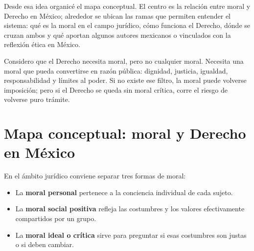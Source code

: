 \documentclass[
	spanish,
	letterpaper, oneside
]{article}
\begin{document}
Desde esa idea organicé el mapa conceptual. El centro es la relación entre moral y Derecho en México; alrededor se ubican las ramas que permiten entender el sistema: qué es la moral en el campo jurídico, cómo funciona el Derecho, dónde se cruzan ambos y qué aportan algunos autores mexicanos o vinculados con la reflexión ética en México.

Considero que el Derecho necesita moral, pero no cualquier moral. Necesita una moral que pueda convertirse en razón pública: dignidad, justicia, igualdad, responsabilidad y límites al poder. Si no existe ese filtro, la moral puede volverse imposición; pero si el Derecho se queda sin moral crítica, corre el riesgo de volverse puro trámite.

%
\section{Mapa conceptual: moral y Derecho en México}

En el ámbito jurídico conviene separar tres formas de moral:

\begin{itemize}
  \item La \textbf{moral personal} pertenece a la conciencia individual de cada sujeto.
  \item La \textbf{moral social positiva} refleja las costumbres y los valores efectivamente compartidos por un grupo.
  \item La \textbf{moral ideal o crítica} sirve para preguntar si esas costumbres son justas o si deben cambiar.
\end{itemize}
\end{document}
